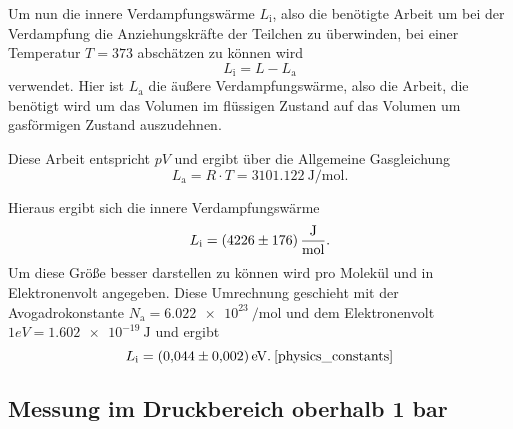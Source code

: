 Um nun die innere Verdampfungswärme $L_\text{i}$, also die benötigte Arbeit um bei der Verdampfung die Anziehungskräfte der Teilchen zu überwinden, bei einer Temperatur $T=373$ abschätzen zu können wird
\begin{equation}
    L_\text{i} = L - L_\text{a}
\end{equation}
verwendet. 
Hier ist $L_\text{a}$ die äußere Verdampfungswärme, also die Arbeit, die benötigt wird um das Volumen im flüssigen Zustand auf das Volumen um gasförmigen Zustand auszudehnen.\cite{V203}

Diese Arbeit entspricht $pV$ und ergibt über die Allgemeine Gasgleichung
\begin{equation*}
    L_\text{a} = R \cdot T = \SI{3101.122}{\joule\per\mol}.
\end{equation*}

Hieraus ergibt sich die innere Verdampfungswärme
\begin{equation*}
    L_\text{i} = \SI{4226+-176}{\joule\per\mol}.
\end{equation*}
Um diese Größe besser darstellen zu können wird pro Molekül und in Elektronenvolt angegeben.
Diese Umrechnung geschieht mit der Avogadrokonstante $N_\text{a} = \SI{6.022e23}{\per\mol}$ und dem Elektronenvolt $1 eV = \SI{1.602e-19}{\joule}$ und ergibt
\begin{equation*}
    L_\text{i} = \SI{0.044+-0.002}{\electronvolt}. \: \text{\cite{physics_constants}}
\end{equation*}


\subsection{Messung im Druckbereich oberhalb 1 bar}
\label{sec:Auswertung_hochdruck}